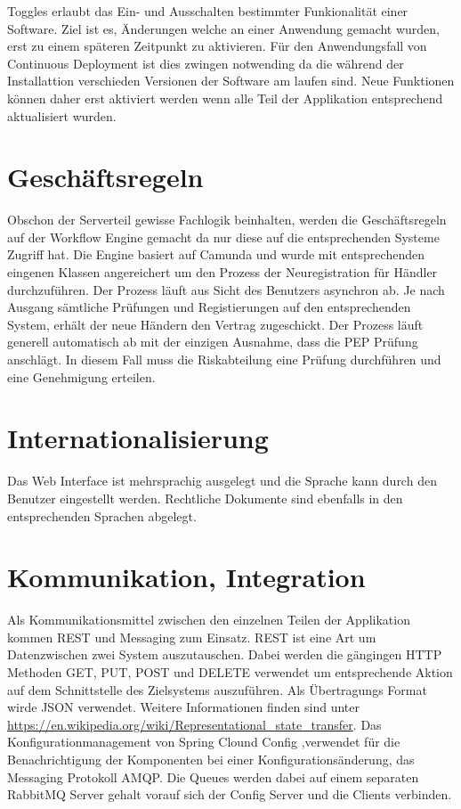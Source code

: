 Toggles erlaubt das Ein- und Ausschalten bestimmter Funkionalität einer Software. Ziel ist es, Änderungen welche an einer Anwendung gemacht wurden, erst zu einem späteren Zeitpunkt zu aktivieren. Für den Anwendungsfall von Continuous Deployment ist dies zwingen notwending da die während der Installattion verschieden Versionen der Software am laufen sind. Neue Funktionen können daher erst aktiviert werden wenn alle Teil der Applikation entsprechend aktualisiert wurden.

\section{Geschäftsregeln}

Obschon der Serverteil gewisse Fachlogik beinhalten, werden die Geschäftsregeln auf der Workflow Engine gemacht da nur diese auf die entsprechenden Systeme Zugriff hat. Die Engine basiert auf Camunda und wurde mit entsprechenden eingenen Klassen angereichert um den Prozess der Neuregistration für Händler durchzuführen. Der Prozess läuft aus Sicht des Benutzers asynchron ab. Je nach Ausgang sämtliche Prüfungen und Registierungen auf den entsprechenden System, erhält der neue Händern den Vertrag zugeschickt. Der Prozess läuft generell automatisch ab mit der einzigen Ausnahme, dass die \gls{PEP} Prüfung anschlägt. In diesem Fall muss die Riskabteilung eine Prüfung durchführen und eine Genehmigung erteilen. 

\section{Internationalisierung}

Das Web Interface ist mehrsprachig ausgelegt und die Sprache kann durch den Benutzer eingestellt werden. Rechtliche Dokumente sind ebenfalls in den entsprechenden Sprachen abgelegt.

\section{Kommunikation, Integration}

Als Kommunikationsmittel zwischen den einzelnen Teilen der Applikation kommen \gls{REST} und Messaging zum Einsatz. REST ist eine Art um Datenzwischen zwei System auszutauschen. Dabei werden die gängingen HTTP Methoden GET, PUT, POST und DELETE verwendet um entsprechende Aktion auf dem Schnittstelle des Zielsystems auszuführen. Als Übertragungs Format wirde JSON verwendet. Weitere Informationen finden sind unter \url{https://en.wikipedia.org/wiki/Representational_state_transfer}.\newline
Das Konfigurationmanagement von Spring Clound Config ,verwendet für die Benachrichtigung der Komponenten bei einer Konfigurationsänderung, das Messaging Protokoll \Gls{AMQP}. Die Queues werden dabei auf einem separaten RabbitMQ Server gehalt vorauf sich der Config Server und die Clients verbinden.

